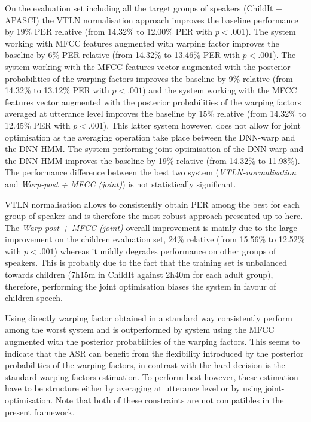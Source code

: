 \documentclass{nle}
\begin{document}
On the evaluation set including all the target groups of speakers (ChildIt + APASCI) the VTLN normalisation approach improves the baseline performance by 19\% PER relative (from 14.32\% to 12.00\% PER with $p  <.001$). The system working with MFCC features augmented with warping factor improves the baseline by 6\% PER relative (from 14.32\% to 13.46\% PER with $p  <.001$). The system working with the MFCC features vector augmented with the posterior probabilities of the warping factors improves the baseline by 9\% relative (from 14.32\% to 13.12\% PER with $p  <.001$) and the system working with the MFCC features vector augmented with the posterior probabilities of the warping factors  averaged at utterance level improves the baseline by 15\% relative (from 14.32\% to 12.45\% PER with $p  <.001$). This latter system however, does not allow for joint optimisation as the averaging operation take place between the DNN-warp and the DNN-HMM. The system performing joint optimisation of the DNN-warp and the DNN-HMM improves the baseline by 19\% relative (from 14.32\% to 11.98\%). The performance difference between the best two system ({\em VTLN-normalisation} and {\em Warp-post + MFCC (joint)}) is not statistically significant.  

VTLN normalisation allows to consistently obtain PER among the best for each group of speaker and is therefore the most robust approach presented up to here. The {\em Warp-post + MFCC (joint)} overall improvement is mainly due to the large improvement on the children evaluation set, 24\% relative (from 15.56\% to 12.52\% with $p  <.001$) whereas it mildly degrades performance on other groups of speakers. This is probably due to the fact that the training set is unbalanced towards children (7h15m in ChildIt against 2h40m for each adult group), therefore, performing the joint optimisation biases the system in favour of children speech.

Using directly warping factor obtained in a standard way consistently perform among the worst system and is outperformed by system using the MFCC augmented with the posterior probabilities of the warping factors. This seems to indicate that the ASR can benefit from the flexibility introduced by the posterior probabilities of the warping factors, in contrast with the hard decision is the standard warping factors estimation. To perform best however, these estimation have to be structure either by averaging at utterance level or by using joint-optimisation. Note that both of these constraints are not compatibles in the present framework.
\end{document}
